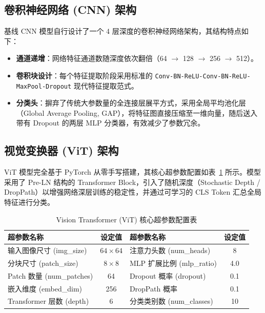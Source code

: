 \documentclass[a4paper, 12pt]{article}
\begin{document}
\subsection{卷积神经网络 (CNN) 架构}
基线 CNN 模型自行设计了一个 4 层深度的卷积神经网络架构，其结构特点如下：
\begin{itemize}
    \item \textbf{通道递增}：网络特征通道数随深度依次翻倍（64 $\rightarrow$ 128 $\rightarrow$ 256 $\rightarrow$ 512）。
    \item \textbf{卷积块设计}：每个特征提取阶段采用标准的 \texttt{Conv-BN-ReLU-Conv-BN-ReLU-MaxPool-Dropout} 现代特征提取范式。
    \item \textbf{分类头}：摒弃了传统大参数量的全连接层展平方式，采用全局平均池化层（Global Average Pooling, GAP），将特征图直接压缩至一维向量，随后送入带有 Dropout 的两层 MLP 分类器，有效减少了参数冗余。
\end{itemize}

\subsection{视觉变换器 (ViT) 架构}
ViT 模型完全基于 PyTorch 从零手写搭建，其核心超参数配置如表~\ref{tab:vit_hyperparams} 所示。模型采用了 Pre-LN 结构的 Transformer Block，引入了随机深度（Stochastic Depth / DropPath）以增强网络深层训练的稳定性，并通过可学习的 CLS Token 汇总全局特征进行分类。

\begin{table}[H]
    \centering
    \caption{Vision Transformer (ViT) 核心超参数配置表}
    \label{tab:vit_hyperparams}
    \renewcommand{\arraystretch}{1.2}
    \begin{tabular}{lc|lc}
        \toprule
        \textbf{超参数名称} & \textbf{设定值} & \textbf{超参数名称} & \textbf{设定值} \\
        \midrule
        输入图像尺寸 (img\_size) & $64 \times 64$ & 注意力头数 (num\_heads) & 8 \\
        分块尺寸 (patch\_size) & $8 \times 8$   & MLP 扩展比例 (mlp\_ratio) & 4.0 \\
        Patch 数量 (num\_patches)& 64             & Dropout 概率 (dropout) & 0.1 \\
        嵌入维度 (embed\_dim)    & 256            & DropPath 概率 & 0.1 \\
        Transformer 层数 (depth)& 6              & 分类类别数 (num\_classes) & 10 \\
        \bottomrule
    \end{tabular}
\end{table}
\end{document}
